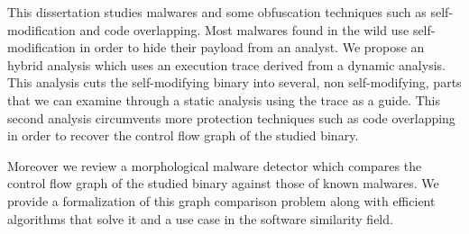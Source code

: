 This dissertation studies malwares and some obfuscation techniques such as self-modification and code overlapping.
Most malwares found in the wild use self-modification in order to hide their payload from an analyst.
We propose an hybrid analysis which uses an execution trace derived from a dynamic analysis.
This analysis cuts the self-modifying binary into several, non self-modifying, parts that we can examine through a static analysis using the trace as a guide.
This second analysis circumvents more protection techniques such as code overlapping in order to recover the control flow graph of the studied binary.

Moreover we review a morphological malware detector which compares the control flow graph of the studied binary against those of known malwares.
We provide a formalization of this graph comparison problem along with efficient algorithms that solve it and a use case in the software similarity field.